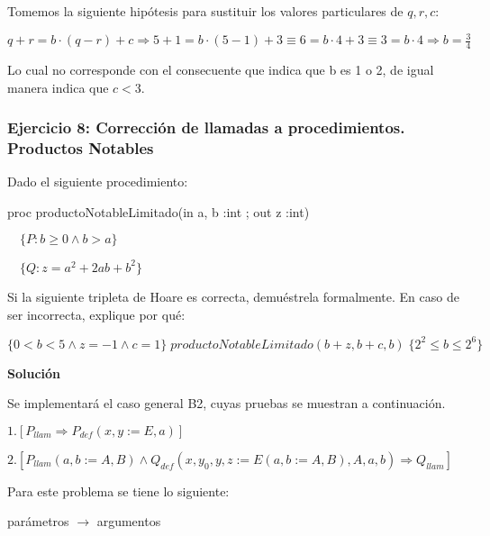 \documentclass[hidelinks]{article}
\begin{document}
Tomemos la siguiente hipótesis para sustituir los valores particulares de
$q,r,c$: \par
$q + r = b \cdot (q - r) + c \Rightarrow 5 + 1 = b \cdot (5 - 1) + 3 \equiv 6 = b \cdot 4 + 3 \equiv 3 = b \cdot 4 \Rightarrow b = \frac{3}{4}$ \par

Lo cual no corresponde con el consecuente que indica que b es 1 o 2, de igual
manera indica que $c < 3$. \par

\newpage


\subsubsection{Ejercicio 8: Corrección de llamadas a procedimientos. Productos Notables}

Dado el siguiente procedimiento: \par

proc productoNotableLimitado(in a, b :int ; out z :int) \par
$\quad \{P: b \geq 0 \land b > a\}$ \par
$\quad \{Q: z = a^2 + 2ab +b^2\}$ \par

Si la siguiente tripleta de Hoare es correcta, demuéstrela formalmente. En caso
de ser incorrecta, explique por qué:\par

$\{ 0 < b < 5 \land z = -1 \land c = 1 \} \; productoNotableLimitado(b + z, b + c, b) \; \{ 2^2 \leq b \leq 2^6 \}$ \par

\textbf{Solución} \par

Se implementará el caso general B2, cuyas pruebas se muestran a continuación. \par

$1. [P_{llam} \Rightarrow P_{def}(x,y := E, a)]$ \par
$2. [P_{llam}(a,b := A,B) \land Q_{def}(x,y_0,y,z := E(a,b := A,B), A, a,b) \Rightarrow Q_{llam}]$ \par

Para este problema se tiene lo siguiente: \par

\hspace{6em} parámetros $\rightarrow$ argumentos \par
\end{document}
